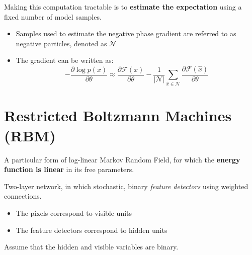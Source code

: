 Making this computation tractable is to \textbf{estimate the expectation} using a
fixed number of model samples.
\begin{itemize}
    \item Samples used to estimate the negative phase gradient are
        referred to as negative particles, denoted as $\mathcal{N}$
    \item The gradient can be written as:
        \[ 
            -\frac{\partial\log{p(x)}}{\partial \theta}\approx
            \frac{\partial \mathcal{F}(x)}{\partial \theta} -
            \frac{1}{|\mathcal{N}|}\sum_{\hat{x}\in\mathcal{N}}\frac{\partial
                \mathcal{F}(\hat{x})}{\partial \theta}
            \]
\end{itemize}

\section{Restricted Boltzmann Machines (RBM)}
A particular form of log-linear Markov Random Field, for which the
\textbf{energy function is linear} in its free parameters.

Two-layer network, in which stochastic, binary \emph{feature detectors}
using weighted connections.

\begin{itemize}
    \item The pixels correspond to visible units
    \item The feature detectors correspond to hidden units
\end{itemize}

Assume that the hidden and visible variables are binary.

